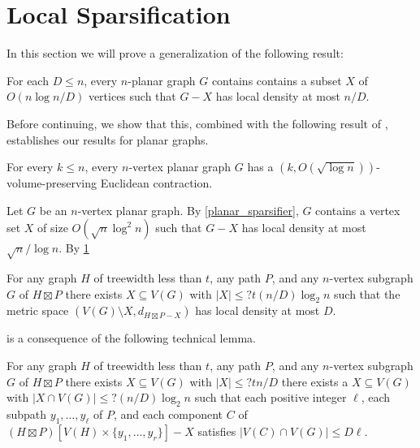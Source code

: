 \documentclass{patmorin}
\begin{document}
\section{Local Sparsification}

In this section we will prove a generalization of the following result:

\begin{lem}\label{planar_sparsifier}
  For each $D\le n$, every $n$-planar graph $G$ contains contains a subset $X$ of $O(n\log n/D)$ vertices such that $G-X$ has local density at most $n/D$.
\end{lem}

Before continuing, we show that this, combined with the following result of \citet{rao:small}, establishes our results for planar graphs.

\begin{thm}
  For every $k\le n$, every $n$-vertex planar graph $G$ has a $(k,O(\sqrt{\log n}))$-volume-preserving Euclidean contraction.
\end{thm}

\begin{cor}

\end{cor}

Let $G$ be an $n$-vertex planar graph.  By \cref{planar_sparsifier}, $G$ contains a vertex set $X$ of size $O(\sqrt{n}\log^2 n)$ such that $G-X$ has local density at most $\sqrt{n}/\log n$.  By \cref{}


\begin{lem}\label{sparsifier_simple}
  For any graph $H$ of treewidth less than $t$, any path $P$, and any $n$-vertex subgraph $G$ of $H\boxtimes P$ there exists $X\subseteq V(G)$ with $|X|\le ?t(n/D)\log_2 n$ such that the metric space $(V(G)\setminus X, d_{H\boxtimes P-X})$ has local density at most $D$.
\end{lem}

 is a consequence of the following technical lemma.

\begin{lem}\label{sparsifier}
  For any graph $H$ of treewidth less than $t$, any path $P$, and any $n$-vertex subgraph $G$ of $H\boxtimes P$ there exists $X\subseteq V(G)$ with $|X|\le ?tn/D$  there exists a $X\subseteq V(G)$ with $|X\cap V(G)|\le ?(n/D)\log_2 n$ such that each positive integer $\ell$, each subpath $y_1,\ldots,y_\ell$ of $P$, and each component $C$ of $(H\boxtimes P)[V(H)\times \{y_1,\ldots,y_r\}]-X$ satisfies $|V(C)\cap V(G)|\le D\ell$.
\end{lem}
\end{document}
